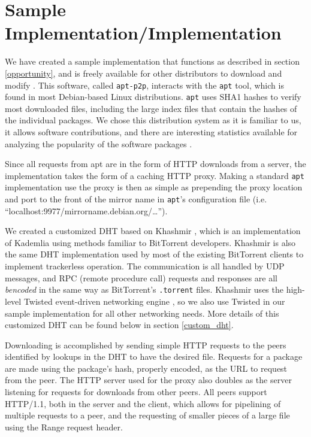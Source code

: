 \documentclass[conference]{IEEEtran}
\begin{document}

\section{Sample Implementation/Implementation}
\label{implementation}

We have created a sample implementation that functions as described
in section \ref{opportunity}, and is freely available for other
distributors to download and modify \cite{apt-p2p}. This software,
called \texttt{apt-p2p}, interacts with the \texttt{apt} tool, which
is found in most Debian-based Linux distributions. \texttt{apt} uses
SHA1 hashes to verify most downloaded files, including the large
index files that contain the hashes of the individual packages. We
chose this distribution system as it is familiar to us, it allows
software contributions, and there are interesting statistics
available for analyzing the popularity of the software packages
\cite{popcon}.

Since all requests from apt are in the form of HTTP downloads from a
server, the implementation takes the form of a caching HTTP proxy.
Making a standard \texttt{apt} implementation use the proxy is then
as simple as prepending the proxy location and port to the front of
the mirror name in \texttt{apt}'s configuration file (i.e.
``localhost:9977/mirrorname.debian.org/\ldots'').

We created a customized DHT based on Khashmir \cite{khashmir}, which
is an implementation of Kademlia \cite{kademlia} using methods
familiar to BitTorrent developers. Khashmir is also the same DHT
implementation used by most of the existing BitTorrent clients to
implement trackerless operation. The communication is all handled by
UDP messages, and RPC (remote procedure call) requests and responses
are all \emph{bencoded} in the same way as BitTorrent's
\texttt{.torrent} files. Khashmir uses the high-level Twisted
event-driven networking engine \cite{twisted}, so we also use
Twisted in our sample implementation for all other networking needs.
More details of this customized DHT can be found below in section
\ref{custom_dht}.

Downloading is accomplished by sending simple HTTP requests to the
peers identified by lookups in the DHT to have the desired file.
Requests for a package are made using the package's hash, properly
encoded, as the URL to request from the peer. The HTTP server used
for the proxy also doubles as the server listening for requests for
downloads from other peers. All peers support HTTP/1.1, both in the
server and the client, which allows for pipelining of multiple
requests to a peer, and the requesting of smaller pieces of a large
file using the Range request header.
\end{document}
